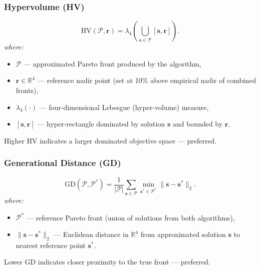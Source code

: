 \subsubsection*{Hypervolume (HV)}
\begin{equation}
\mathrm{HV}(\mathcal{P},\mathbf{r})
= \lambda_4\!\left(
    \bigcup_{\mathbf{s}\in\mathcal{P}}
    [\mathbf{s},\mathbf{r}]
  \right).
\label{eq:hv}
\end{equation}
\textit{where:}
\begin{itemize}
  \item $\mathcal{P}$ — approximated Pareto front produced by the
        algorithm,
  \item $\mathbf{r} \in \mathbb{R}^4$ — reference nadir point (set at
        10\% above empirical nadir of combined fronts),
  \item $\lambda_4(\cdot)$ — four-dimensional Lebesgue (hyper-volume)
        measure,
  \item $[\mathbf{s},\mathbf{r}]$ — hyper-rectangle dominated by
        solution $\mathbf{s}$ and bounded by $\mathbf{r}$.
\end{itemize}
Higher HV indicates a larger dominated objective space — preferred.

\subsubsection*{Generational Distance (GD)}
\begin{equation}
\mathrm{GD}(\mathcal{P},\mathcal{P}^*)
= \frac{1}{|\mathcal{P}|}
  \sum_{\mathbf{s}\in\mathcal{P}}
  \min_{\mathbf{s}^*\in\mathcal{P}^*}
  \|\mathbf{s} - \mathbf{s}^*\|_2.
\label{eq:gd}
\end{equation}
\textit{where:}
\begin{itemize}
  \item $\mathcal{P}^*$ — reference Pareto front (union of solutions
        from both algorithms),
  \item $\|\mathbf{s} - \mathbf{s}^*\|_2$ — Euclidean distance in
        $\mathbb{R}^4$ from approximated solution $\mathbf{s}$ to
        nearest reference point $\mathbf{s}^*$.
\end{itemize}
Lower GD indicates closer proximity to the true front — preferred.

